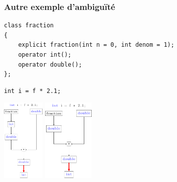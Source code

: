 \begin{frame}[containsverbatim]
\frametitle{Autre exemple d'ambiguïté}
\begin{lstlisting}
class fraction
{
	explicit fraction(int n = 0, int denom = 1);
	operator int();
	operator double();	
};
\end{lstlisting}
\begin{lstlisting}
int i = f * 2.1;
\end{lstlisting}
\begin{center}
\includegraphics[height=4cm]{pics/conv-3.pdf}
\hspace{2cm}
\includegraphics[height=4cm]{pics/conv-5.pdf}
\end{center}
\end{frame}

